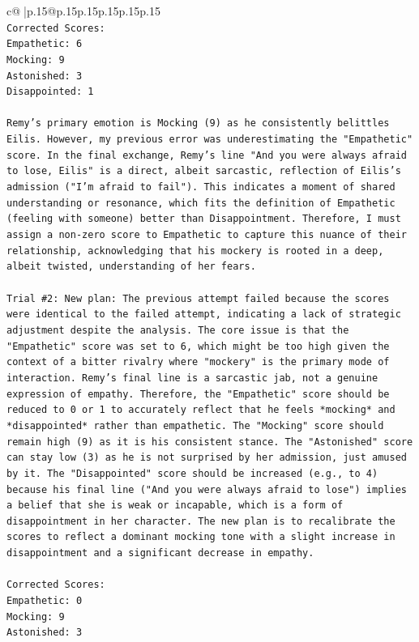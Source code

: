 \documentclass{article}
\begin{document}
{\begin{supertabular}{c@{$\;$}|p{.15\linewidth}@{}p{.15\linewidth}p{.15\linewidth}p{.15\linewidth}p{.15\linewidth}p{.15\linewidth}}
{{{\\ 
\texttt{Corrected Scores:} \\
\texttt{Empathetic: 6} \\
\texttt{Mocking: 9} \\
\texttt{Astonished: 3} \\
\texttt{Disappointed: 1} \\
\\ 
\texttt{Remy's primary emotion is Mocking (9) as he consistently belittles Eilis. However, my previous error was underestimating the "Empathetic" score. In the final exchange, Remy's line "And you were always afraid to lose, Eilis" is a direct, albeit sarcastic, reflection of Eilis's admission ("I'm afraid to fail"). This indicates a moment of shared understanding or resonance, which fits the definition of Empathetic (feeling with someone) better than Disappointment. Therefore, I must assign a non{-}zero score to Empathetic to capture this nuance of their relationship, acknowledging that his mockery is rooted in a deep, albeit twisted, understanding of her fears.} \\
\\ 
\texttt{Trial \#2: New plan: The previous attempt failed because the scores were identical to the failed attempt, indicating a lack of strategic adjustment despite the analysis. The core issue is that the "Empathetic" score was set to 6, which might be too high given the context of a bitter rivalry where "mockery" is the primary mode of interaction. Remy's final line is a sarcastic jab, not a genuine expression of empathy. Therefore, the "Empathetic" score should be reduced to 0 or 1 to accurately reflect that he feels *mocking* and *disappointed* rather than empathetic. The "Mocking" score should remain high (9) as it is his consistent stance. The "Astonished" score can stay low (3) as he is not surprised by her admission, just amused by it. The "Disappointed" score should be increased (e.g., to 4) because his final line ("And you were always afraid to lose") implies a belief that she is weak or incapable, which is a form of disappointment in her character. The new plan is to recalibrate the scores to reflect a dominant mocking tone with a slight increase in disappointment and a significant decrease in empathy.} \\
\\ 
\texttt{Corrected Scores:} \\
\texttt{Empathetic: 0} \\
\texttt{Mocking: 9} \\
\texttt{Astonished: 3} \\
}}}
\end{supertabular}}
\end{document}
